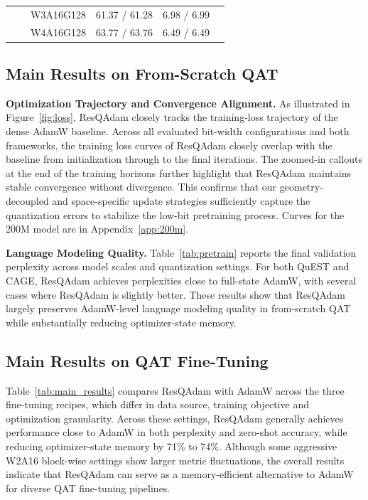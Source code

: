\documentclass{article} %
\begin{document}
\begin{table}[]
\begin{tabular}{c|c|c|c|c|c}
                              &                              & W3A16G128 & 61.37 / 61.28                                                               & 6.98 / 6.99                                                           &                     \\
                              &                              & W4A16G128 & 63.77 / 63.76                                                               & 6.49 / 6.49                                                           &                    \\ \bottomrule
\end{tabular}
\vspace{-12px}
\end{table}



\subsection{Main Results on From-Scratch QAT}
\label{sec:results_from_scratch}

\textbf{Optimization Trajectory and Convergence Alignment.}
As illustrated in Figure~\ref{fig:loss}, ResQAdam closely tracks the training-loss trajectory of the dense AdamW baseline. 
Across all evaluated bit-width configurations and both  frameworks, the training loss curves of ResQAdam closely overlap with the baseline from initialization through to the final iterations.
The zoomed-in callouts at the end of the training horizons further highlight that ResQAdam maintains stable convergence without divergence. 
This confirms that our geometry-decoupled and space-specific update strategies sufficiently capture the quantization errors to stabilize the low-bit pretraining process. Curves for the 200M model are in Appendix~\ref{app:200m}.

\textbf{Language Modeling Quality.}
Table~\ref{tab:pretrain} reports the final validation perplexity across model scales and quantization settings. 
For both QuEST and CAGE, ResQAdam achieves perplexities close to full-state AdamW, with several cases where ResQAdam is slightly better. 
These results show that ResQAdam largely preserves AdamW-level language modeling quality in from-scratch QAT while substantially reducing optimizer-state memory.

\subsection{Main Results on QAT Fine-Tuning}
\label{sec:results_fine_tuning}
Table~\ref{tab:main_results} compares ResQAdam with AdamW across the three fine-tuning recipes, which differ in data source, training objective and optimization granularity. 
Across these settings, ResQAdam generally achieves performance close to AdamW in both perplexity and zero-shot accuracy, while reducing optimizer-state memory by 71\% to 74\%. 
Although some aggressive W2A16 block-wise settings show larger metric fluctuations, the overall results indicate that ResQAdam can serve as a memory-efficient alternative to AdamW for diverse QAT fine-tuning pipelines.
\end{document}
